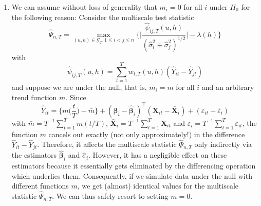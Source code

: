\documentclass[a4paper,12pt]{article}
\begin{document}
\begin{enumerate}[label=\arabic*.,leftmargin=0.6cm]
\begin{enumerate}[label=(\roman*),leftmargin=0.75cm,topsep=0pt]
\item We can assume without loss of generality that $m_i=0$ for all $i$ under $H_0$ for the following reason:
Consider the multiscale test statistic 
\[ \widehat{\Psi}_{n,T} = \max_{(u,h) \in \mathcal{G}_T, 1 \le i < j \le n} \Big\{ \Big| \frac{\widehat{\psi}_{ij,T}(u,h)}{(\widehat{\sigma}_i^2 + \widehat{\sigma}_j^2)^{1/2}} \Big| - \lambda(h) \Big\} \]
with
\[ \widehat{\psi}_{ij,T}(u,h) = \sum_{t=1}^T w_{t,T}(u,h) (\widehat{Y}_{it} - \widehat{Y}_{jt}) \]
and suppose we are under the null, that is, $m_i = m$ for all $i$ and an arbitrary trend function $m$. Since
\[ \widehat{Y}_{it} = \Big\{ m\Big(\frac{t}{T}\Big) - \bar{m} \Big\} + (\boldsymbol{\beta}_i - \widehat{\boldsymbol{\beta}}_i)^\top (\boldsymbol{X}_{it} - \bar{\boldsymbol{X}}_i) + (\varepsilon_{it} - \bar{\varepsilon}_i) \]
with $\bar{m} = T^{-1} \sum_{t=1}^T m(t/T)$, $\bar{\boldsymbol{X}}_i = T^{-1} \sum_{t=1}^T \boldsymbol{X}_{it}$ and $\bar{\varepsilon}_i = T^{-1} \sum_{t=1}^T \varepsilon_{it}$, the function $m$ cancels out exactly (not only approximately!) in the difference $\widehat{Y}_{it} - \widehat{Y}_{jt}$. 
Therefore, it affects the multiscale statistic $\widehat{\Psi}_{n,T}$ only indirectly via the estimators $\widehat{\boldsymbol{\beta}}_i$ and $\widehat{\sigma}_i$. However, it has a negligible effect on these estimators because it essentially gets eliminated by the differencing operation which underlies them. Consequently, if we simulate data under the null with different functions $m$, we get (almost) identical values for the multiscale statistic $\widehat{\Psi}_{n,T}$. We can thus safely resort to setting $m=0$. 

\end{enumerate}
\end{enumerate}
\end{document}
